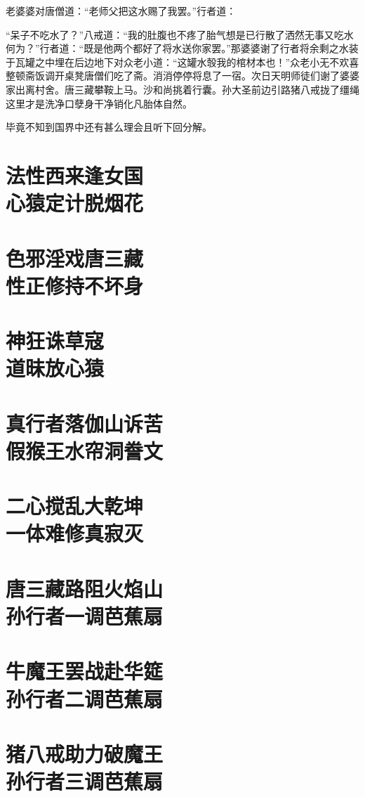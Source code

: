\documentclass[12pt,UTF8]{ctexbook}
\begin{document}
{老婆婆对唐僧道：“老师父把这水赐了我罢。”行者道：

“呆子不吃水了？”八戒道：“我的肚腹也不疼了胎气想是已行散了洒然无事又吃水何为？”行者道：“既是他两个都好了将水送你家罢。”那婆婆谢了行者将余剩之水装于瓦罐之中埋在后边地下对众老小道：“这罐水彀我的棺材本也！”众老小无不欢喜整顿斋饭调开桌凳唐僧们吃了斋。消消停停将息了一宿。次日天明师徒们谢了婆婆家出离村舍。唐三藏攀鞍上马。沙和尚挑着行囊。孙大圣前边引路猪八戒拢了缰绳这里才是洗净口孽身干净销化凡胎体自然。

毕竟不知到国界中还有甚么理会且听下回分解。

\chapter[法性西来逢女国\ 心猿定计脱烟花]{法性西来逢女国\\心猿定计脱烟花}
\chapter[色邪淫戏唐三藏\ 性正修持不坏身]{色邪淫戏唐三藏\\性正修持不坏身}
\chapter[神狂诛草寇\ 道昧放心猿]{神狂诛草寇\\道昧放心猿}
\chapter[真行者落伽山诉苦\ 假猴王水帘洞誊文]{真行者落伽山诉苦\\假猴王水帘洞誊文}
\chapter[二心搅乱大乾坤\ 一体难修真寂灭]{二心搅乱大乾坤\\一体难修真寂灭}
\chapter[唐三藏路阻火焰山\ 孙行者一调芭蕉扇]{唐三藏路阻火焰山\\孙行者一调芭蕉扇}
\chapter[牛魔王罢战赴华筵\ 孙行者二调芭蕉扇]{牛魔王罢战赴华筵\\孙行者二调芭蕉扇}
\chapter[猪八戒助力破魔王\ 孙行者三调芭蕉扇]{猪八戒助力破魔王\\孙行者三调芭蕉扇}
}
\end{document}

